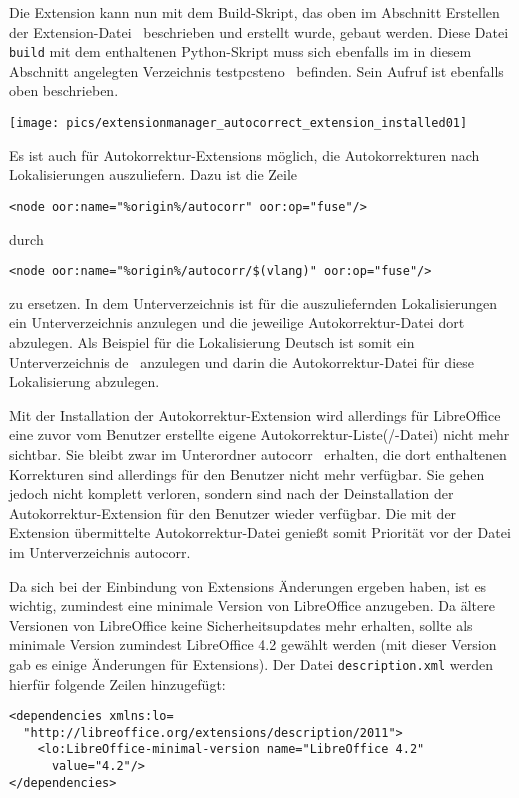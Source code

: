 \documentclass[a4paper,10pt,pagesize,titlepage]{scrbook}
\begin{document}
Die Extension kann nun mit dem Build-Skript, das oben im Abschnitt \glqq Erstellen der Extension-Datei\grqq~ beschrieben und erstellt wurde, gebaut werden. Diese Datei \verb|build| mit dem enthaltenen Python-Skript muss sich ebenfalls im in diesem Abschnitt angelegten Verzeichnis \glqq testpcsteno\grqq~ befinden. Sein Aufruf ist ebenfalls oben beschrieben.

\begin{center}
	\captionsetup{type=figure}
	\texttt{[image: pics/extensionmanager\_autocorrect\_extension\_installed01]}
	\label{fig:autocorr_extension_extension_manager}
\end{center}



Es ist auch für Autokorrektur-Extensions möglich, die Autokorrekturen nach Lokalisierungen auszuliefern. Dazu ist die Zeile
\begin{lstlisting}
<node oor:name="%origin%/autocorr" oor:op="fuse"/>
\end{lstlisting}

durch
\begin{lstlisting}
<node oor:name="%origin%/autocorr/$(vlang)" oor:op="fuse"/>
\end{lstlisting}

zu ersetzen. In dem Unterverzeichnis ist für die auszuliefernden Lokalisierungen ein Unterverzeichnis anzulegen und die jeweilige  Autokorrektur-Datei dort abzulegen. Als Beispiel für die Lokalisierung Deutsch ist somit ein Unterverzeichnis \glqq de\grqq~ anzulegen und darin die Autokorrektur-Datei für diese Lokalisierung abzulegen.

Mit der Installation der Autokorrektur-Extension wird allerdings für LibreOffice eine zuvor vom Benutzer erstellte eigene Autokorrektur-Liste(/-Datei) nicht mehr sichtbar. Sie bleibt zwar im Unterordner \glqq autocorr\grqq~ erhalten, die dort enthaltenen Korrekturen sind allerdings für den Benutzer nicht mehr verfügbar. Sie gehen jedoch nicht komplett verloren, sondern sind nach der Deinstallation der Autokorrektur-Extension für den Benutzer wieder verfügbar. Die mit der Extension übermittelte Autokorrektur-Datei genießt somit Priorität vor der Datei im Unterverzeichnis \glqq autocorr\grqq.

Da sich bei der Einbindung von Extensions Änderungen ergeben haben, ist es wichtig, zumindest eine minimale Version von LibreOffice anzugeben. Da ältere Versionen von LibreOffice keine Sicherheitsupdates mehr erhalten, sollte als minimale Version zumindest LibreOffice 4.2 gewählt werden (mit dieser Version gab es einige Änderungen für Extensions). Der Datei \verb|description.xml| werden hierfür folgende Zeilen hinzugefügt:
\begin{lstlisting}
<dependencies xmlns:lo=
  "http://libreoffice.org/extensions/description/2011">
    <lo:LibreOffice-minimal-version name="LibreOffice 4.2" 
      value="4.2"/>
</dependencies>
\end{lstlisting}
\end{document}
